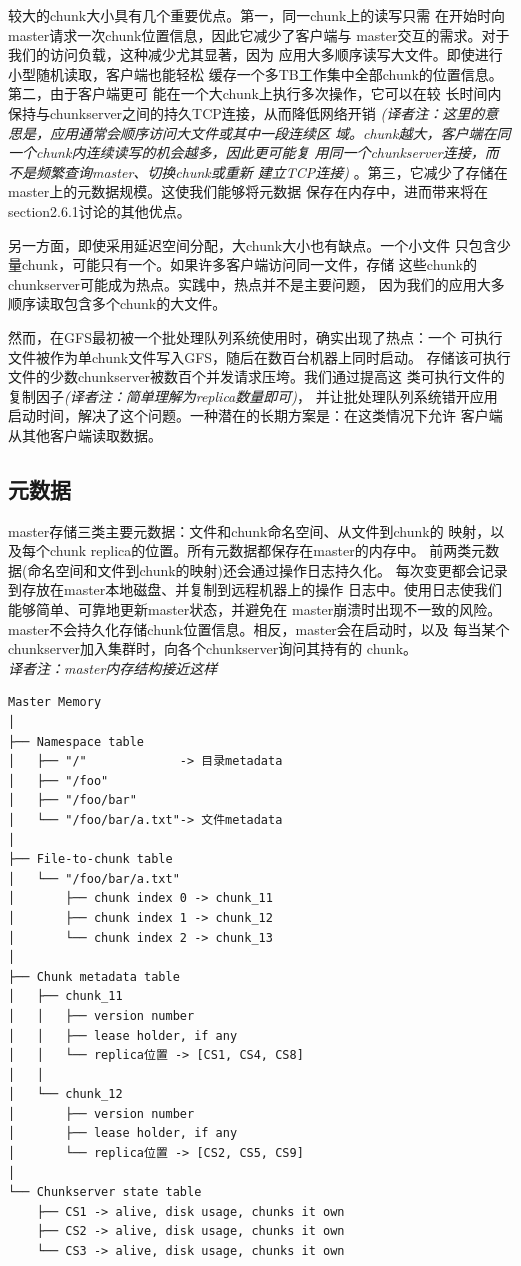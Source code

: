 较大的chunk大小具有几个重要优点。第一，同一chunk上的读写只需
在开始时向master请求一次chunk位置信息，因此它减少了客户端与
master交互的需求。对于我们的访问负载，这种减少尤其显著，因为
应用大多顺序读写大文件。即使进行小型随机读取，客户端也能轻松
缓存一个多TB工作集中全部chunk的位置信息。第二，由于客户端更可
能在一个大chunk上执行多次操作，它可以在较
长时间内保持与chunkserver之间的持久TCP连接，从而降低网络开销
\emph{(译者注：这里的意思是，应用通常会顺序访问大文件或其中一段连续区
域。chunk越大，客户端在同一个chunk内连续读写的机会越多，因此更可能复
用同一个chunkserver连接，而不是频繁查询master、切换chunk或重新
建立TCP连接)}
。第三，它减少了存储在master上的元数据规模。这使我们能够将元数据
保存在内存中，进而带来将在section2.6.1讨论的其他优点。

另一方面，即使采用延迟空间分配，大chunk大小也有缺点。一个小文件
只包含少量chunk，可能只有一个。如果许多客户端访问同一文件，存储
这些chunk的chunkserver可能成为热点。实践中，热点并不是主要问题，
因为我们的应用大多顺序读取包含多个chunk的大文件。

然而，在GFS最初被一个批处理队列系统使用时，确实出现了热点：一个
可执行文件被作为单chunk文件写入GFS，随后在数百台机器上同时启动。
存储该可执行文件的少数chunkserver被数百个并发请求压垮。我们通过提高这
类可执行文件的复制因子\emph{(译者注：简单理解为replica数量即可)}，
并让批处理队列系统错开应用
启动时间，解决了这个问题。一种潜在的长期方案是：在这类情况下允许
客户端从其他客户端读取数据。

\subsection{元数据}
master存储三类主要元数据：文件和chunk命名空间、从文件到chunk的
映射，以及每个chunk replica的位置。所有元数据都保存在master的内存中。
前两类元数据(命名空间和文件到chunk的映射)还会通过操作日志持久化。
每次变更都会记录到存放在master本地磁盘、并复制到远程机器上的操作
日志中。使用日志使我们能够简单、可靠地更新master状态，并避免在
master崩溃时出现不一致的风险。
master不会持久化存储chunk位置信息。相反，master会在启动时，以及
每当某个chunkserver加入集群时，向各个chunkserver询问其持有的
chunk。
\\\emph{译者注：master内存结构接近这样}\\
\begin{minipage}{\columnwidth}
{\scriptsize
\begin{verbatim}
Master Memory
│
├── Namespace table
│   ├── "/"             -> 目录metadata
│   ├── "/foo"
│   ├── "/foo/bar"
│   └── "/foo/bar/a.txt"-> 文件metadata
│
├── File-to-chunk table
│   └── "/foo/bar/a.txt"
│       ├── chunk index 0 -> chunk_11
│       ├── chunk index 1 -> chunk_12
│       └── chunk index 2 -> chunk_13
│
├── Chunk metadata table
│   ├── chunk_11
│   │   ├── version number
│   │   ├── lease holder, if any
│   │   └── replica位置 -> [CS1, CS4, CS8]
│   │
│   └── chunk_12
│       ├── version number
│       ├── lease holder, if any
│       └── replica位置 -> [CS2, CS5, CS9]
│
└── Chunkserver state table
    ├── CS1 -> alive, disk usage, chunks it own
    ├── CS2 -> alive, disk usage, chunks it own
    └── CS3 -> alive, disk usage, chunks it own
\end{verbatim}
}
\end{minipage}

